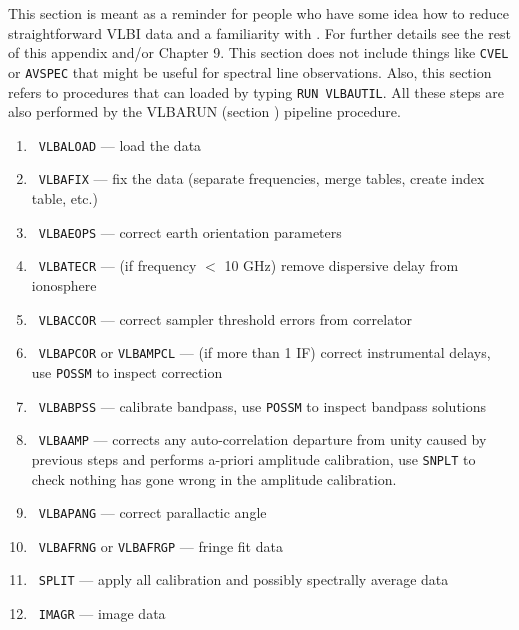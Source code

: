 %

This section is meant as a reminder for people who have some idea how
to reduce straightforward  VLBI data and a familiarity with \AIPS\@.
For further details see the rest of this appendix and/or Chapter 9.
This section does not include things like {\tt CVEL} or {\tt AVSPEC}
that might be useful for spectral line observations.  Also, this section
refers to procedures that can loaded by typing {\tt RUN VLBAUTIL}.  All
these steps are also performed by the VLBARUN (section )
pipeline procedure.
\begin{enumerate}
\item\ {{\tt VLBALOAD} --- load the data}
\item\ {{\tt VLBAFIX} --- fix the data (separate frequencies, merge tables, create index table, etc.)}
\item\ {{\tt VLBAEOPS} --- correct earth orientation parameters}
\item\ {{\tt VLBATECR} --- (if frequency $<$ 10 GHz) remove dispersive delay from ionosphere}
\item\ {{\tt VLBACCOR} --- correct sampler threshold errors from correlator}
\item\ {{\tt VLBAPCOR} or {\tt VLBAMPCL} --- (if more than 1 IF) correct instrumental delays, use {\tt POSSM}
                    to inspect correction}
\item\ {{\tt VLBABPSS} --- calibrate bandpass, use {\tt POSSM} to inspect bandpass solutions}
\item\ {{\tt VLBAAMP} --- corrects any auto-correlation departure from unity caused by
                         previous steps and performs a-priori amplitude calibration, use {\tt SNPLT} to check
                         nothing has gone wrong in the amplitude calibration.}
\item\ {{\tt VLBAPANG} --- correct parallactic angle}
\item\ {{\tt VLBAFRNG} or {\tt VLBAFRGP} --- fringe fit data}
\item\ {{\tt SPLIT} --- apply all calibration and possibly spectrally average data}
\item\ {{\tt IMAGR} --- image data}
\end{enumerate}

